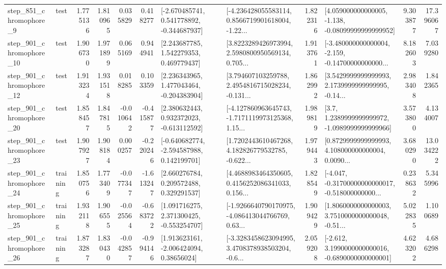 \begin{tabular}{llrrrrllrlrr}
   step\_851\_chromophore\_9 &      test &      1.775136 &    1.810965 &      0.035829 &  0.418277 &   [-2.670485741, 0.541778892, -0.344687937] &  [-4.236428055583114, 0.8566719901618004, -1.22... &       1.822316 &  [4.059000000000005, -1.138, -0.08099999999999952] &            9.303877 &         17.396067 \\
  step\_901\_chromophore\_10 &      test &      1.906730 &    1.971899 &      0.065169 &  0.944941 &     [2.243687785, 1.542279353, 0.469779437] &  [3.8223289426973994, 2.5980800950569134, 0.705... &       1.913761 &  [-3.480000000000004, -2.159, -0.14700000000000... &            8.182603 &          7.039280 \\
  step\_901\_chromophore\_12 &      test &      1.913234 &    1.931518 &      0.018285 &  0.103359 &    [2.236343965, 1.477043464, -0.204383904] &  [3.794607103259788, 2.4954816715028234, -0.131... &       1.862992 &  [3.5429999999999993, 2.1739999999999995, -0.14... &            2.983408 &          1.842365 \\
  step\_901\_chromophore\_20 &      test &      1.858457 &    1.847815 &     -0.010642 & -0.415877 &    [2.380632443, 0.932372023, -0.613112592] &  [-4.127860963645743, -1.7171119973125368, 1.15... &       1.989819 &     [3.7, 1.2389999999999972, -1.0989999999999966] &            3.573800 &          4.134007 \\
  step\_901\_chromophore\_23 &      test &      1.907927 &    1.908184 &      0.000257 & -0.220246 &   [-0.640682774, -2.594587988, 0.142199701] &  [1.7202443610467268, 4.182826779532785, -0.622... &       1.979443 &  [0.8729999999999993, 4.108000000000004, 0.0090... &            3.680290 &         13.034222 \\
  step\_901\_chromophore\_24 &  training &      1.850756 &    1.773409 &     -0.077347 & -1.613247 &     [2.660276784, 0.209572488, 0.329291537] &  [4.4688983464350605, 0.4156252086341033, 0.156... &       1.828549 &  [-4.047, -0.31700000000000017, -0.518000000000... &            0.238632 &          5.345996 \\
  step\_901\_chromophore\_25 &  training &      1.932118 &    1.906555 &     -0.025564 & -0.683722 &    [1.091716275, 2.371300425, -0.553254707] &  [-1.9266640790170975, -4.086413044766769, 0.63... &       1.909429 &  [1.8060000000000003, 3.7510000000000048, -0.51... &            5.022835 &          1.100689 \\
  step\_901\_chromophore\_26 &  training &      1.873287 &    1.830430 &     -0.042857 & -0.994146 &     [1.913623161, -2.006424094, 0.38656024] &  [-3.3283458623094995, 3.4708378938503204, -0.6... &       2.059208 &  [-2.612, 3.1990000000000016, -0.6890000000000001] &            4.623202 &          4.686298 \\

\end{tabular}
